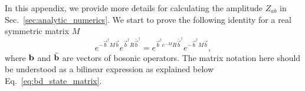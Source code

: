 
In this appendix, we provide more details for calculating the amplitude $Z_{ab}$ in Sec.~\ref{sec:analytic_numerics}. We start to prove the following identity for a real symmetric matrix $M$
\begin{equation}
\label{eq:first_id_app_pf_of_id}
e^{- \vec{b}^{\dagger} M \vec{b} } e^{ \vec{b}^{\dagger} R \bar{\vec{b}}^{\dagger} }  = e^{ \vec{b}^{\dagger} e^{-M}  R \bar{\vec{b}}^{\dagger} } e^{- \vec{b}^{\dagger} M \vec{b} } ,
\end{equation}
where ${\bf b}$ and $\bar{\bf b}$ are vectors of bosonic operators. The matrix notation here should be understood as a bilinear expression as explained below Eq.~\eqref{eq:bd_state_matrix}.  

